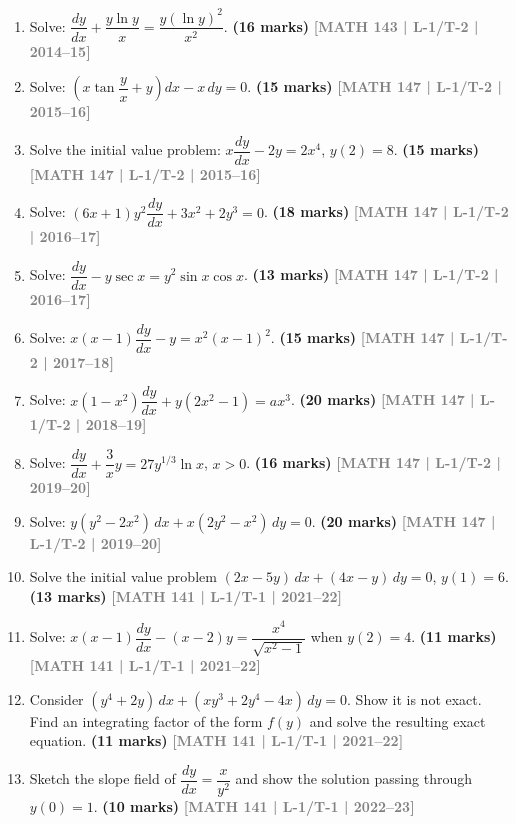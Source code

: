 \documentclass[12pt,a4paper]{article}
\newcommand{\yr}[1]{\hfill\textcolor{gray}{\small\textbf{[#1]}}}
\newcommand{\mk}[1]{\textcolor{orange!70!black}{\small\textbf{(#1 marks)}}}
\begin{document}
\begin{enumerate}
\item Solve: $\dfrac{dy}{dx}+\dfrac{y\ln y}{x}=\dfrac{y(\ln y)^{2}}{x^{2}}$.
\mk{16} \yr{MATH 143 | L-1/T-2 | 2014--15}

\item Solve: $\left(x\tan\dfrac{y}{x}+y\right)dx - x\,dy = 0$.
\mk{15} \yr{MATH 147 | L-1/T-2 | 2015--16}

\item Solve the initial value problem: $x\dfrac{dy}{dx}-2y=2x^{4}$, $y(2)=8$.
\mk{15} \yr{MATH 147 | L-1/T-2 | 2015--16}

\item Solve: $(6x+1)y^{2}\dfrac{dy}{dx}+3x^{2}+2y^{3}=0$.
\mk{18} \yr{MATH 147 | L-1/T-2 | 2016--17}

\item Solve: $\dfrac{dy}{dx}-y\sec x=y^{2}\sin x\cos x$.
\mk{13} \yr{MATH 147 | L-1/T-2 | 2016--17}

\item Solve: $x(x-1)\dfrac{dy}{dx}-y=x^{2}(x-1)^{2}$.
\mk{15} \yr{MATH 147 | L-1/T-2 | 2017--18}

\item Solve: $x(1-x^{2})\dfrac{dy}{dx}+y(2x^{2}-1)=ax^{3}$.
\mk{20} \yr{MATH 147 | L-1/T-2 | 2018--19}

\item Solve: $\dfrac{dy}{dx}+\dfrac{3}{x}y=27y^{1/3}\ln x$, $x>0$.
\mk{16} \yr{MATH 147 | L-1/T-2 | 2019--20}

\item Solve: $y(y^{2}-2x^{2})\,dx+x(2y^{2}-x^{2})\,dy=0$.
\mk{20} \yr{MATH 147 | L-1/T-2 | 2019--20}

\item Solve the initial value problem $(2x-5y)\,dx+(4x-y)\,dy=0$, $y(1)=6$.
\mk{13} \yr{MATH 141 | L-1/T-1 | 2021--22}

\item Solve: $x(x-1)\dfrac{dy}{dx}-(x-2)y=\dfrac{x^{4}}{\sqrt{x^{2}-1}}$ when $y(2)=4$.
\mk{11} \yr{MATH 141 | L-1/T-1 | 2021--22}

\item Consider $(y^{4}+2y)\,dx+(xy^{3}+2y^{4}-4x)\,dy=0$. Show it is not exact. Find an integrating factor of the form $f(y)$ and solve the resulting exact equation.
\mk{11} \yr{MATH 141 | L-1/T-1 | 2021--22}

\item Sketch the slope field of $\dfrac{dy}{dx}=\dfrac{x}{y^{2}}$ and show the solution passing through $y(0)=1$.
\mk{10} \yr{MATH 141 | L-1/T-1 | 2022--23}


\end{enumerate}
\end{document}
